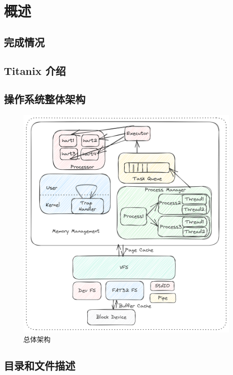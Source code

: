 \section{概述}

\subsection{完成情况}

\subsection{Titanix 介绍}

\subsection{操作系统整体架构}

\begin{figure}[hbt]
    \centering
    \includegraphics[width=.9\linewidth]{figure/architecture.png}
    \caption{总体架构}
    \label{pic:architecture}
\end{figure}

\subsection{目录和文件描述}

